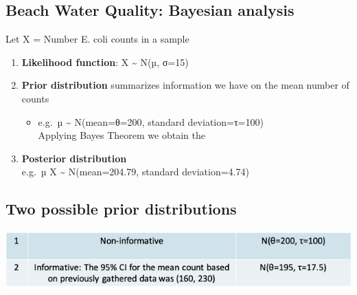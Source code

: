 \documentclass[
]{book}
\providecommand{\tightlist}{%
  \setlength{\itemsep}{0pt}\setlength{\parskip}{0pt}}
\begin{document}
\hypertarget{beach-water-quality-bayesian-analysis}{%
\subsection{Beach Water Quality: Bayesian analysis}\label{beach-water-quality-bayesian-analysis}}

Let X = Number E. coli counts in a sample

\begin{enumerate}
\def\labelenumi{\arabic{enumi}.}
\tightlist
\item
  \textbf{Likelihood function}: X \textasciitilde{} N(µ, σ=15)
\item
  \textbf{Prior distribution} summarizes information we have on the mean number of counts

  \begin{itemize}
  \tightlist
  \item
    e.g.~µ \textasciitilde{} N(mean=θ=200, standard deviation=τ=100)\\
    Applying Bayes Theorem we obtain the\\
  \end{itemize}
\item
  \textbf{Posterior distribution}\\
  e.g.~µ \textbar{} X \textasciitilde{} N(mean=204.79, standard deviation=4.74)
\end{enumerate}

\hypertarget{two-possible-prior-distributions}{%
\subsection{Two possible prior distributions}\label{two-possible-prior-distributions}}

\includegraphics[width=1\linewidth]{./6_14}
\end{document}
